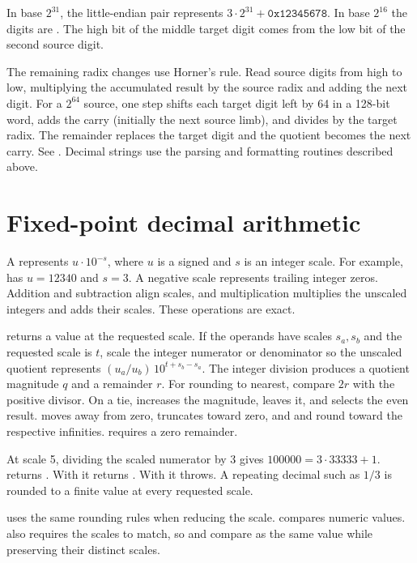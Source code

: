 \begin{example}
In base $2^{31}$, the little-endian pair \code{[0x12345678, 3]} represents
$3\cdot 2^{31} + \texttt{0x12345678}$. In base $2^{16}$ the digits are
\code{[0x5678, 0x9234, 1]}. The high bit of the middle target digit
comes from the low bit of the second source digit.
\end{example}

The remaining radix changes use Horner's rule. Read source digits
from high to low, multiplying the accumulated result by the source radix and
adding the next digit. For a $2^{64}$ source, one step shifts each target digit
left by 64 in a 128-bit word, adds the carry (initially the next source limb),
and divides by the target radix. The remainder replaces the target digit and
the quotient becomes the next carry. See .
Decimal strings use the parsing and formatting routines described above.

\section{Fixed-point decimal arithmetic}
\label{sec:bigdecimal}

A  represents $u\cdot 10^{-s}$, where $u$ is a signed
 and $s$ is an integer scale. For example,
 has $u=12340$ and $s=3$. A negative scale represents
trailing integer zeros. Addition and subtraction align scales, and
multiplication multiplies the unscaled integers and adds their scales.
These operations are exact.

 returns a value at the requested scale.
If the operands have scales $s_a,s_b$ and the requested scale is $t$,
scale the integer numerator or denominator so the unscaled quotient
represents $(u_a/u_b)\,10^{t+s_b-s_a}$. The integer division produces a
quotient magnitude $q$ and a remainder $r$. For rounding to nearest,
compare $2r$ with the positive divisor. On a tie,  increases
the magnitude,  leaves it, and  selects
the even result.  moves away from zero,  truncates
toward zero, and  and  round toward the
respective infinities.  requires a zero remainder.

\begin{example}
At scale 5, dividing the scaled numerator by 3 gives $100000=3\cdot33333+1$.
returns . With  it returns .
With  it throws. A repeating decimal such as $1/3$
is rounded to a finite value at every requested scale.
\end{example}

 uses the same rounding rules when reducing the scale.
 compares numeric values.  also requires
the scales to match, so  and  compare as the same
value while preserving their distinct scales.
